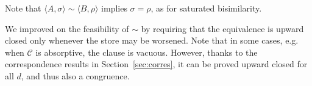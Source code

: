\documentclass{llncs}
\newcommand{\comment}[1]{}
\def\monid{{\mathbf 0}}
\def\monid{\mathbf{1}}
\begin{document}
Note that $\langle A, \sigma \rangle \sim \langle B, \rho \rangle$ implies
$\sigma = \rho$, as for saturated bisimilarity.
%
\comment{
\begin{definition}[Weak bisimilarity]\label{def:weakbis} A weak bisimulation is a symmetric relation $R$ on configurations such that whenever
$( \langle A, \sigma \rangle,\langle B, \rho \rangle) \in R$
\begin{enumerate}
\item if $\langle A, \sigma \rangle \downarrow_c$ then $\langle B, \rho \rangle \Downarrow_c$;
\item if $\langle A, \sigma \rangle \xrightarrow{\alpha} \gamma_1$ then there is $\gamma_2$ such that $\langle B, \rho \otimes \alpha \rangle \Rightarrow \gamma_2$ 
and $(\gamma_1, \gamma_2) \in R$;
\end{enumerate}
We say that $\gamma_1$ and $\gamma_2$ are  weakly bisimilar ($\gamma_1  \approx \gamma_2$) if there exists a  
weak  bisimulation $R$ such that $(\gamma_1 , \gamma_2 ) \in R$. 
We write $A \approx B$ if $\langle A, \monid \rangle \approx \langle B, \monid \rangle$.
\end{definition}

\begin{lemma}[Weak bisimilarity, 2]\label{def:weakbis2}
Weak bisimilarity coincides with the relation 
obtained from Definition~\ref{def:strongbis} by replacing $\to$ with $\Rightarrow$ and $\downarrow_c$ with $\Downarrow_c$.
\end{lemma}

\begin{proposition}
Let $\langle A,\sigma \rangle, \langle B,\rho \rangle$ be configurations 
and $c, d \in \mathcal{C}$.
If $\langle A,\sigma \rangle \approx \langle B,\rho \rangle$
and $\langle A,\sigma \otimes d\rangle \downarrow_c$ then 
then $\langle B, \rho \otimes d\rangle \Downarrow_c$.
\end{proposition}
}
%
We improved on the feasibility of $\sim$ by requiring that the equivalence is upward closed 
only whenever the store may be worsened. Note that in some cases, e.g. 
when $\mathcal{C}$ is absorptive, the clause is vacuous. 
%
However, thanks to the correspondence results in Section~\ref{sec:corres}, 
it can be proved upward closed for all $d$, and thus also a congruence.
%
\end{document}
